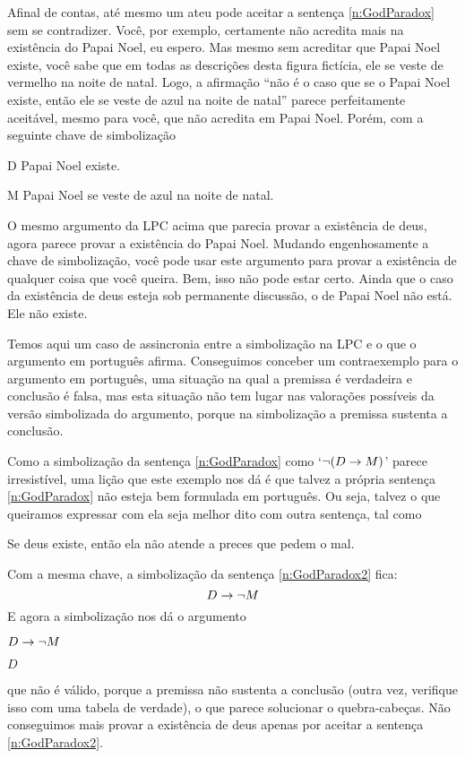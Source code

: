 Afinal de contas, até mesmo um ateu pode aceitar a sentença \ref{n:GodParadox} sem se contradizer.
Você, por exemplo, certamente não acredita mais na existência do Papai Noel, eu espero.
Mas mesmo sem acreditar que Papai Noel existe, você sabe que em todas as descrições desta figura fictícia, ele se veste de vermelho na noite de natal.
Logo, a afirmação ``não é o caso que se o Papai Noel existe, então ele se veste de azul na noite de natal'' parece perfeitamente aceitável, mesmo para você, que não acredita em Papai Noel.
Porém, com a seguinte chave de simbolização
\begin{ekey}
	\item[D] Papai Noel existe.
	\item[M] Papai Noel se veste de azul na noite de natal.
\end{ekey}
O mesmo argumento da LPC acima que parecia provar a existência de deus, agora parece provar a existência do Papai Noel.
Mudando engenhosamente a chave de simbolização, você pode usar este argumento para provar a existência de qualquer coisa que você queira.
Bem, isso não pode estar certo.
Ainda que o caso da existência de deus esteja sob permanente discussão, o de Papai Noel não está. Ele não existe. %

Temos aqui um caso de assincronia entre a simbolização na LPC e o que o argumento em português afirma.
Conseguimos conceber um contraexemplo para o argumento em português, uma situação na qual a premissa é verdadeira e conclusão é falsa, mas esta situação não tem lugar nas valorações possíveis da versão simbolizada do argumento, porque na simbolização a premissa sustenta a conclusão.

Como a simbolização da sentença \ref{n:GodParadox} como `$\neg (D \rightarrow M)$' parece irresistível, uma lição que este exemplo nos dá é que talvez a própria sentença \ref{n:GodParadox} não esteja bem formulada em português.
Ou seja, talvez o que queiramos expressar com ela seja melhor dito com outra sentença, tal como
        	\begin{earg}
                  \setcounter{eargnum}{3}	
                \item\label{n:GodParadox2} Se deus existe, então ela não atende a preces que pedem o mal.
  \end{earg}
Com a mesma chave, a simbolização da sentença \ref{n:GodParadox2} fica:
$$D \rightarrow \neg M$$
E agora a simbolização nos dá o argumento
	\begin{earg}
		\item[] $D \rightarrow \neg M$
		\item[\therefore] $D$
	\end{earg}
que não é válido, porque a premissa não sustenta a conclusão (outra vez, verifique isso com uma tabela de verdade), o que parece solucionar o quebra-cabeças.
Não conseguimos mais provar a existência de deus apenas por aceitar a sentença  \ref{n:GodParadox2}.

